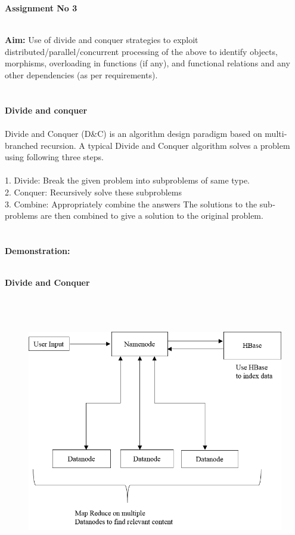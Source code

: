 \documentclass[11pt]{article}
\begin{document}
\noindent
\textbf{
	\large Assignment No 3 \\ \\
} 

\textbf{
	 Aim​:} Use of divide and conquer strategies to exploit distributed/parallel/concurrent processing of the  above  to identify objects, morphisms, overloading in functions (if any), and functional relations and any other  dependencies (as per requirements).  \\ \\ \\

\noindent
\textbf{Divide and conquer} \\ \\
Divide and Conquer (D\&C) is an algorithm design paradigm based on multi­branched recursion.  A typical Divide and Conquer algorithm solves a problem using following three steps. \\ \\
1. Divide: Break the given problem into subproblems of same type. \\
2. Conquer: Recursively solve these subproblems \\
3. Combine: Appropriately combine the answers  The solutions to the sub­problems are then combined to give a solution to the original problem. \\ \\ \\

\textbf{Demonstration:} \\ \\


\newpage

\large \textbf{Divide and Conquer} \\ \\ \\ \\
\begin{figure}[h]
\includegraphics{divide_and_conquer}
\end{figure}
\end{document}
